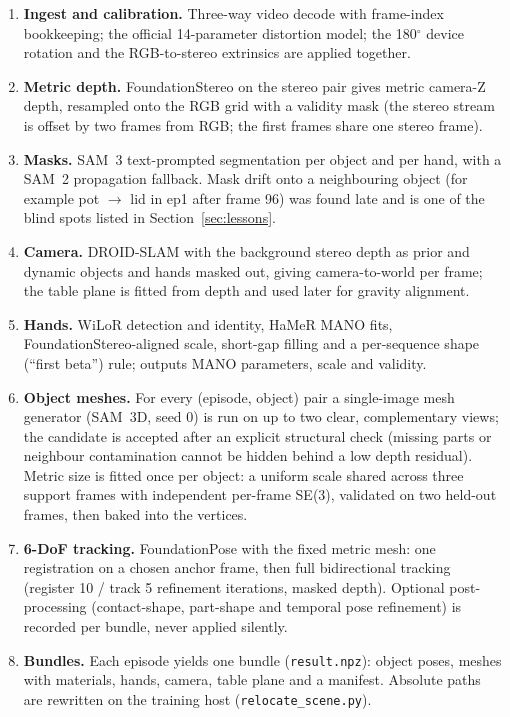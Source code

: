\documentclass[10pt,a4paper]{article}
\newcommand{\code}[1]{\texttt{#1}}
\begin{document}
\begin{enumerate}
\item \textbf{Ingest and calibration.} Three-way video decode with frame-index bookkeeping; the official 14-parameter distortion model; the 180$^\circ$ device rotation and the RGB-to-stereo extrinsics are applied together.
\item \textbf{Metric depth.} FoundationStereo on the stereo pair gives metric camera-Z depth, resampled onto the RGB grid with a validity mask (the stereo stream is offset by two frames from RGB; the first frames share one stereo frame).
\item \textbf{Masks.} SAM~3 text-prompted segmentation per object and per hand, with a SAM~2 propagation fallback. Mask drift onto a neighbouring object (for example pot $\to$ lid in ep1 after frame 96) was found late and is one of the blind spots listed in Section~\ref{sec:lessons}.
\item \textbf{Camera.} DROID-SLAM with the background stereo depth as prior and dynamic objects and hands masked out, giving camera-to-world per frame; the table plane is fitted from depth and used later for gravity alignment.
\item \textbf{Hands.} WiLoR detection and identity, HaMeR MANO fits, FoundationStereo-aligned scale, short-gap filling and a per-sequence shape (``first beta'') rule; outputs MANO parameters, scale and validity.
\item \textbf{Object meshes.} For every (episode, object) pair a single-image mesh generator (SAM~3D, seed 0) is run on up to two clear, complementary views; the candidate is accepted after an explicit structural check (missing parts or neighbour contamination cannot be hidden behind a low depth residual). Metric size is fitted once per object: a uniform scale shared across three support frames with independent per-frame SE(3), validated on two held-out frames, then baked into the vertices.
\item \textbf{6-DoF tracking.} FoundationPose with the fixed metric mesh: one registration on a chosen anchor frame, then full bidirectional tracking (register 10 / track 5 refinement iterations, masked depth). Optional post-processing (contact-shape, part-shape and temporal pose refinement) is recorded per bundle, never applied silently.
\item \textbf{Bundles.} Each episode yields one bundle (\code{result.npz}): object poses, meshes with materials, hands, camera, table plane and a manifest. Absolute paths are rewritten on the training host (\code{relocate\_scene.py}).
\end{enumerate}
\end{document}
